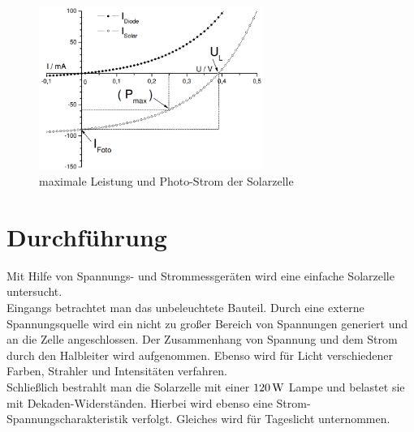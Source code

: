 \documentclass[numbers=noenddot,12pt,a4paper]{scrartcl}
\begin{document}
\begin{figure}[h]
	\centering
	\includegraphics[width=0.65\textwidth]{detail.png}
	\caption{maximale Leistung und Photo-Strom der Solarzelle} \label{img:detail}
	\end{figure}
\section{Durchführung}
Mit Hilfe von Spannungs- und Strommessgeräten wird eine einfache Solarzelle untersucht.\\
Eingangs betrachtet man das unbeleuchtete Bauteil. Durch eine externe Spannungsquelle wird ein nicht zu großer Bereich von Spannungen generiert und an die Zelle angeschlossen. Der Zusammenhang von Spannung und dem Strom durch den Halbleiter wird aufgenommen. Ebenso wird für Licht verschiedener Farben, Strahler und Intensitäten verfahren.\\
Schließlich bestrahlt man die Solarzelle mit einer $\unit[120]{W}$ Lampe und belastet sie mit Dekaden-Widerständen. Hierbei wird ebenso eine Strom-Spannungscharakteristik verfolgt. Gleiches wird für Tageslicht unternommen.
\end{document}
